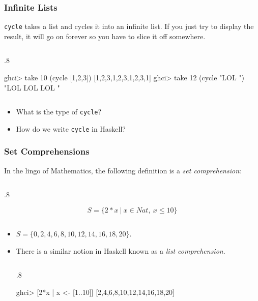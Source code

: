 \documentclass{beamer}
\newenvironment{codeblock}[1][.8]{%
\begin{columns}
\begin{column}{#1\linewidth}
\begin{exampleblock}{}}{%
\end{exampleblock}
\end{column}
\end{columns}}
\begin{document}

\begin{frame}[fragile]
\frametitle{Infinite Lists}

\verb+cycle+ takes a list and cycles it into an infinite list. If you just try to display the result, it will go on forever so you have to slice it off somewhere.

\begin{codeblock}
\begin{hcode}
ghci> take 10 (cycle [1,2,3])  
[1,2,3,1,2,3,1,2,3,1]  
ghci> take 12 (cycle "LOL ")  
"LOL LOL LOL " 
\end{hcode}
\end{codeblock}

\begin{itemize}

\item What is the type of \verb+cycle+?

\item How do we write \verb+cycle+ in Haskell?

\end{itemize}

\end{frame}


\begin{frame}[fragile]
\frametitle{Set Comprehensions}

In the lingo of Mathematics, the following definition is a \emph{set comprehension}:
\begin{codeblock}
\[
S = \{ 2 \ast x ~|~ x \in Nat,~ x \leq 10 \}
\]
\end{codeblock}

\begin{itemize}

\item \(S = \{ 0, 2, 4, 6, 8, 10, 12, 14, 16, 18, 20 \}\).

\pause

\item There is a similar notion in Haskell known as a \emph{list comprehension}. 
\begin{codeblock}
\begin{hcode}
ghci> [2*x | x <- [1..10]]  
[2,4,6,8,10,12,14,16,18,20] 
\end{hcode}
\end{codeblock}

\end{itemize}

\end{frame}
\end{document}
